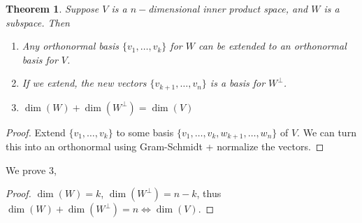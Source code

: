 \documentclass{article}
\newtheorem{theorem}{Theorem}[section]
\newtheorem{one minute paper}[theorem]{One Minute Paper}
\begin{document}
\begin{theorem}
    Suppose $V$ is a $n-$dimensional inner product space, and $W$ is a subspace. Then 
    \begin{enumerate}
        \item Any orthonormal basis $\{v_1, \dots, v_k\}$ for $W$ can be extended to an orthonormal basis for $V$. 
        \item If we extend, the new vectors $\{v_{k+1}, \dots, v_n\}$ is a basis for $W^{\perp}$. 
        \item $\dim(W) + \dim(W^{\perp}) = \dim(V)$
    \end{enumerate}
\end{theorem}

\begin{proof}
    Extend $\{v_1, \dots, v_k\}$ to some basis $\{v_1, \dots, v_k, w_{k+1}, \dots, w_{n}\}$ of $V$. We can turn this into an orthonormal using Gram-Schmidt + normalize the vectors. 
\end{proof}

We prove $3$, 

\begin{proof}
    $\dim(W) = k$, $\dim(W^{\perp}) = n-k$, thus $\dim(W) + \dim(W^{\perp}) = n \iff \dim(V)$.  
\end{proof}
\end{document}
